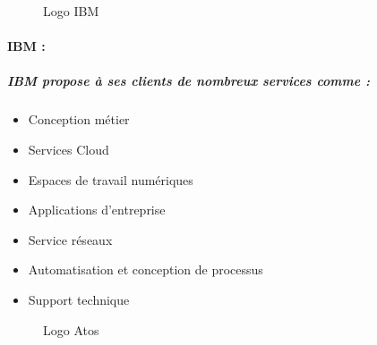 \documentclass{article}
\begin{document}
\begin{figure}[H]
  \caption{Logo IBM}
\end{figure}

\paragraph{IBM :}

  \subparagraph{IBM propose à ses clients de nombreux services comme :}
    \begin{itemize}
      \item Conception métier
      \item Services Cloud
      \item Espaces de travail numériques
      \item Applications d'entreprise
      \item Service réseaux
      \item Automatisation et conception de processus
      \item Support technique
    \end{itemize}

\begin{figure}[H]
  \caption{Logo Atos}
\end{figure}
\end{document}
